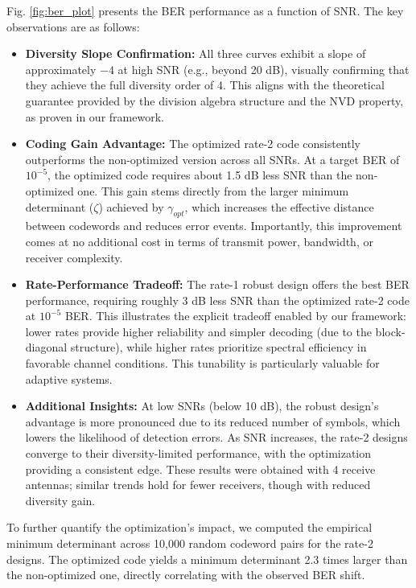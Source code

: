 \documentclass[twocolumn,conference]{IEEEtran}
\begin{document}
Fig. \ref{fig:ber_plot} presents the BER performance as a function of SNR. The key observations are as follows:
\begin{itemize}
    \item \textbf{Diversity Slope Confirmation:} All three curves exhibit a slope of approximately \(-4\) at high SNR (e.g., beyond 20 dB), visually confirming that they achieve the full diversity order of 4. This aligns with the theoretical guarantee provided by the division algebra structure and the NVD property, as proven in our framework.
    
    \item \textbf{Coding Gain Advantage:} The optimized rate-2 code consistently outperforms the non-optimized version across all SNRs. At a target BER of \(10^{-5}\), the optimized code requires about 1.5 dB less SNR than the non-optimized one. This gain stems directly from the larger minimum determinant (\(\zeta\)) achieved by \(\gamma_{opt}\), which increases the effective distance between codewords and reduces error events. Importantly, this improvement comes at no additional cost in terms of transmit power, bandwidth, or receiver complexity.
    
    \item \textbf{Rate-Performance Tradeoff:} The rate-1 robust design offers the best BER performance, requiring roughly 3 dB less SNR than the optimized rate-2 code at \(10^{-5}\) BER. This illustrates the explicit tradeoff enabled by our framework: lower rates provide higher reliability and simpler decoding (due to the block-diagonal structure), while higher rates prioritize spectral efficiency in favorable channel conditions. This tunability is particularly valuable for adaptive systems.
    
    \item \textbf{Additional Insights:} At low SNRs (below 10 dB), the robust design's advantage is more pronounced due to its reduced number of symbols, which lowers the likelihood of detection errors. As SNR increases, the rate-2 designs converge to their diversity-limited performance, with the optimization providing a consistent edge. These results were obtained with 4 receive antennas; similar trends hold for fewer receivers, though with reduced diversity gain.
\end{itemize}

To further quantify the optimization's impact, we computed the empirical minimum determinant across 10,000 random codeword pairs for the rate-2 designs. The optimized code yields a minimum determinant 2.3 times larger than the non-optimized one, directly correlating with the observed BER shift.
\end{document}
